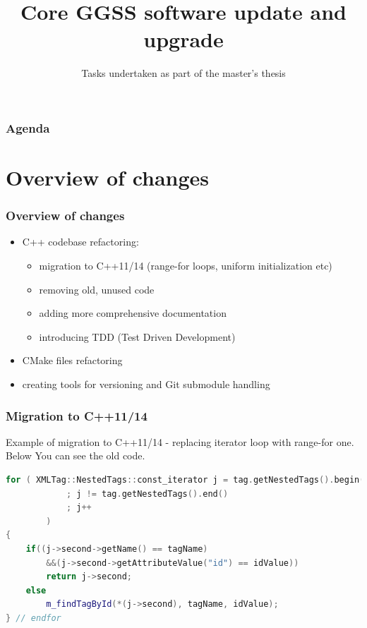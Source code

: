 \documentclass[10pt]{beamer}
\title{Core GGSS software update and upgrade}
\subtitle{\normalsize{Tasks undertaken as part of the master's thesis}}
\author{\normalsize{Arkadiusz Kasprzak \newline \and 
    Jarosław Cierpich \newline \newline \and 
    Supervisor: Bartosz Mindur}}
\date{}
\begin{document}
\titleframe[en]

\begin{frame}
\frametitle{Agenda}
\tableofcontents
\end{frame}

\section {Overview of changes}


\begin{frame}
\frametitle{Overview of changes}
\begin{itemize}
    \item C++ codebase refactoring: \begin{itemize}
        \item migration to C++11/14 (range-for loops, uniform initialization etc)
        \item removing old, unused code 
        \item adding more comprehensive documentation
        \item introducing TDD (Test Driven Development)
    \end{itemize}
    \item CMake files refactoring
    \item creating tools for versioning and Git submodule handling
\end{itemize}
\end{frame}


\begin{frame}[fragile]
\frametitle{Migration to C++11/14}
Example of migration to C++11/14 - replacing iterator loop with range-for one. Below You can see the old code.
\begin{lstlisting}[language=c++, caption={Example of old C++ code (before refactoring).}]
for ( XMLTag::NestedTags::const_iterator j = tag.getNestedTags().begin()
            ; j != tag.getNestedTags().end()
            ; j++
        )
{
    if((j->second->getName() == tagName)
        &&(j->second->getAttributeValue("id") == idValue))
        return j->second;
    else
        m_findTagById(*(j->second), tagName, idValue);		
} // endfor
\end{lstlisting}
\end{frame}
\end{document}
